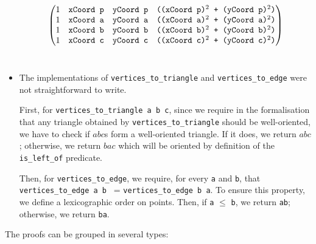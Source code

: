 \documentclass[a4paper,10pt]{article}
\begin{document}
\begin{itemize}
  $$\left( \begin{matrix}
1 & \text{{\tt xCoord  p}} & \text{{\tt yCoord  p}}& \text{{\tt ((xCoord  p)$^2$ + (yCoord  p)$^2$)}}\\
1 & \text{{\tt xCoord  a}} & \text{{\tt yCoord  a}}& \text{{\tt ((xCoord  a)$^2$ + (yCoord  a)$^2$)}}\\
1 & \text{{\tt xCoord  b}} & \text{{\tt yCoord  b}}& \text{{\tt ((xCoord  b)$^2$ + (yCoord  b)$^2$)}}\\
1 & \text{{\tt xCoord  c}} & \text{{\tt yCoord  c}}& \text{{\tt ((xCoord  c)$^2$ + (yCoord  c)$^2$)}}
\end{matrix} \right) $$\\
\item The implementations of {\tt vertices\_to\_triangle} and {\tt vertices\_to\_edge} were not straightforward to write.

  First, for {\tt vertices\_to\_triangle a b c}, since we require in the formalisation that any triangle obtained by {\tt vertices\_to\_triangle} should be well-oriented, we have to check if $abc$s form a well-oriented triangle. If it does, we return $abc$; otherwise, we return $bac$ which will be oriented by definition of the {\tt is\_left\_of} predicate.

  Then, for {\tt vertices\_to\_edge}, we require, for every {\tt a} and {\tt b}, that {\tt vertices\_to\_edge a b } = {\tt vertices\_to\_edge b a}. To ensure this property, we define a lexicographic order on points. Then, if {\tt a} $\leq$ {\tt b}, we return {\tt ab}; otherwise, we return {\tt ba}.
\end{itemize}
The proofs can be grouped in several types:
\end{document}
